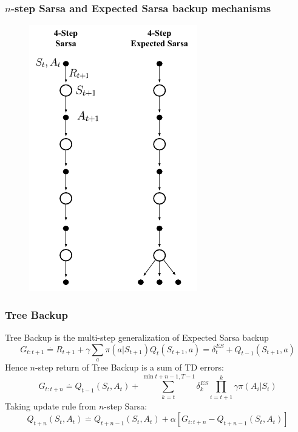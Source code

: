 \documentclass{beamer}
\begin{document}
\begin{frame}
  \frametitle{$n$-step Sarsa and Expected Sarsa backup mechanisms}
  \begin{figure}
    \centering
    \includegraphics[height=0.7 \textheight]{sarsa-backup}
  \end{figure}
\end{frame}

\begin{frame}
  \frametitle{Tree Backup}
  Tree Backup is the multi-step generalization of Expected Sarsa backup
  $$G_{t : t + 1} \overset{\cdot}{=} R_{t + 1} +
    \gamma \sum_{a} \pi(a | S_{t + 1}) Q_t(S_{t + 1}, a) = \delta^{ES}_t
    + Q_{t - 1}(S_{t + 1}, a)$$
  Hence $n$-step return of Tree Backup is a sum of TD errors:
  $$G_{t : t + n} \overset{\cdot}{=} Q_{t -1}(S_t, A_t) +
    \sum_{k = t}^{\min{t + n - 1, T - 1}} \delta_k^{ES} \prod_{i = t + 1}^k
    \gamma \pi(A_i | S_i)$$
  Taking update rule from $n$-step Sarsa:
  $$Q_{t + n}(S_t, A_t) \overset{\cdot}{=} Q_{t + n - 1}(S_t, A_t) +
    \alpha[G_{t : t + n} - Q_{t + n -1}(S_t, A_t)]$$
\end{frame}
\end{document}
